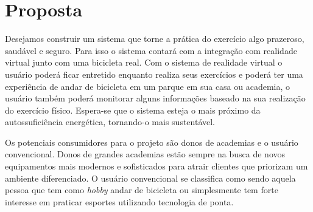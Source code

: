 \chapter[Proposta]{Proposta}

Desejamos construir um sistema que torne a prática do exercício algo prazeroso, saudável e seguro. Para isso o sistema contará 
com a integração com realidade virtual junto com uma bicicleta real. Com o sistema de realidade virtual o usuário poderá ficar entretido enquanto 
realiza seus exercícios e poderá ter uma experiência de andar de bicicleta em um parque em sua casa ou academia, o usuário também poderá monitorar
alguns informações baseado na sua realização do exercício físico. Espera-se que o sistema esteja o mais próximo da autossuficiência energética, tornando-o mais
sustentável.

Os potenciais consumidores para o projeto são donos de academias e o usuário convencional. Donos de grandes academias estão sempre na busca de novos equipamentos mais modernos e sofisticados para atrair clientes que priorizam um ambiente diferenciado. O usuário convencional se classifica como sendo aquela pessoa que tem como \textit{hobby} andar de bicicleta ou simplesmente tem forte interesse em praticar esportes utilizando tecnologia de ponta.
